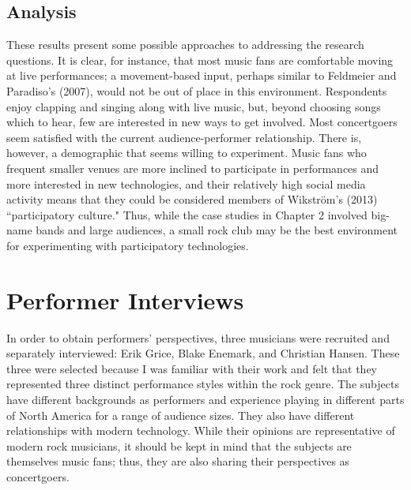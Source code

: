 \subsection{Analysis}

These results present some possible approaches to addressing the research questions. It is clear, for instance, that most music fans are comfortable moving at live performances; a movement-based input, perhaps similar to Feldmeier and Paradiso's (2007), would not be out of place in this environment. Respondents enjoy clapping and singing along with live music, but, beyond choosing songs which to hear, few are interested in new ways to get involved. Most concertgoers seem satisfied with the current audience-performer relationship. There is, however, a demographic that seems willing to experiment. Music fans who frequent smaller venues are more inclined to participate in performances and more interested in new technologies, and their relatively high social media activity means that they could be considered members of Wikstr\"{o}m's (2013) ``participatory culture." Thus, while the case studies in Chapter 2 involved big-name bands and large audiences, a small rock club may be the best environment for experimenting with participatory technologies.



\section{Performer Interviews}

In order to obtain performers' perspectives, three musicians were recruited and separately interviewed: Erik Grice, Blake Enemark, and Christian Hansen. These three were selected because I was familiar with their work and felt that they represented three distinct performance styles within the rock genre. The subjects have different backgrounds as performers and experience playing in different parts of North America for a range of audience sizes. They also have different relationships with modern technology. While their opinions are representative of modern rock musicians, it should be kept in mind that the subjects are themselves music fans; thus, they are also sharing their perspectives as concertgoers.

